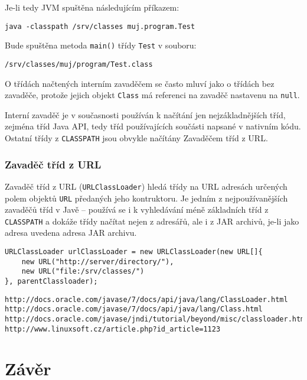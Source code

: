 Je-li tedy JVM spuštěna následujícím příkazem:

\begin{verbatim}
java -classpath /srv/classes muj.program.Test
\end{verbatim}

Bude spuštěna metoda {\tt main()} třídy {\tt Test} v souboru:

\begin{verbatim}
/srv/classes/muj/program/Test.class
\end{verbatim}

O třídách načtených interním zavaděčem se často mluví jako o třídách bez zavaděče, protože jejich objekt {\tt Class} má referenci na zavaděč nastavenu na {\tt null}. \cite[3.2.1]{oaks}

Interní zavaděč je v současnosti používán k načítání jen nejzákladnějších tříd, zejména tříd Java API, tedy tříd používajících součásti napsané v nativním kódu. Ostatní třídy z {\tt CLASSPATH} jsou obvykle načítány Zavaděčem tříd z URL.

\subsection{Zavaděč tříd z URL}

Zavaděč tříd z URL ({\tt URLClassLoader}) hledá třídy na URL adresách určených polem objektů {\tt URL} předaných jeho kontruktoru. Je jedním z nejpoužívanějších zavaděčů tříd v Javě -- používá se i k vyhledávání méně základních tříd z {\tt CLASSPATH} a dokáže třídy načítat nejen z adresářů, ale i z JAR archivů, je-li jako adresa uvedena adresa JAR archivu. \cite[3.2.5]{oaks}

\begin{verbatim}
URLClassLoader urlClassLoader = new URLClassLoader(new URL[]{
    new URL("http://server/directory/"),
    new URL("file:/srv/classes/")
}, parentClassloader);
\end{verbatim}




\begin{verbatim}
http://docs.oracle.com/javase/7/docs/api/java/lang/ClassLoader.html
http://docs.oracle.com/javase/7/docs/api/java/lang/Class.html
http://docs.oracle.com/javase/jndi/tutorial/beyond/misc/classloader.html
http://www.linuxsoft.cz/article.php?id_article=1123
\end{verbatim}












\chapter{Závěr}

